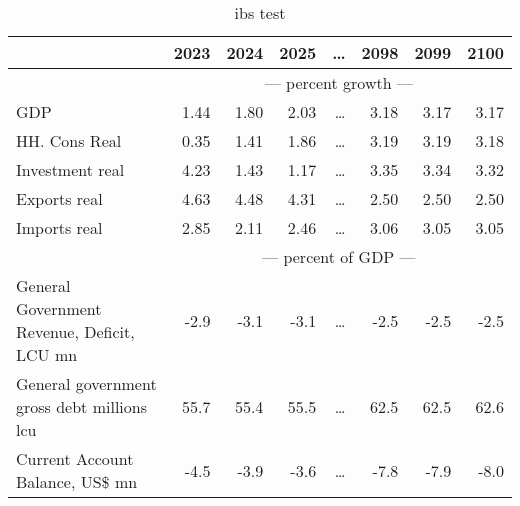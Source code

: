 \documentclass{article}
\begin{document}
\begin{table}[ht]
\caption{ibs test}
\begin{tabular}{lrrrrrrr}
\toprule
 & 2023 & 2024 & 2025 & \dots & 2098 & 2099 & 2100 \\
\midrule
&\multicolumn{7}{c}{{--- percent growth ---}}                                                             & \dots                                                             \\
GDP & 1.44 & 1.80 & 2.03 & \dots & 3.18 & 3.17 & 3.17 \\
HH. Cons Real & 0.35 & 1.41 & 1.86 & \dots & 3.19 & 3.19 & 3.18 \\
Investment real & 4.23 & 1.43 & 1.17 & \dots & 3.35 & 3.34 & 3.32 \\
Exports real & 4.63 & 4.48 & 4.31 & \dots & 2.50 & 2.50 & 2.50 \\
Imports real & 2.85 & 2.11 & 2.46 & \dots & 3.06 & 3.05 & 3.05 \\
&\multicolumn{7}{c}{{--- percent of GDP ---}}                                                             & \dots                                                             \\
General Government Revenue, Deficit, LCU mn & -2.9 & -3.1 & -3.1 & \dots & -2.5 & -2.5 & -2.5 \\
General government gross debt millions lcu & 55.7 & 55.4 & 55.5 & \dots & 62.5 & 62.5 & 62.6 \\
Current Account Balance, US\$ mn & -4.5 & -3.9 & -3.6 & \dots & -7.8 & -7.9 & -8.0 \\
\bottomrule
\end{tabular}
\end{table}
\end{document}
